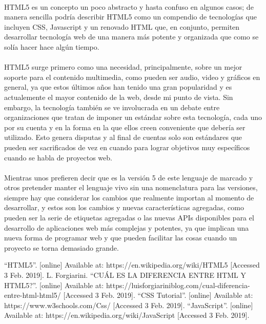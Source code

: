 \documentclass{article}
\begin{document}
\paragraph{}
HTML5 es un concepto un poco abstracto y hasta confuso en algunos casos; de
manera sencilla podría describir HTML5 como un compendio de tecnologías que
incluyen CSS, Javascript y un renovado HTML que, en conjunto, permiten
desarrollar tecnología web de una manera más potente y organizada que como se
solía hacer hace algún tiempo.

\paragraph{}
HTML5 surge primero como una necesidad, principalmente, sobre un mejor soporte
para el contenido multimedia, como pueden ser audio, video y gráficos en general,
ya que estos últimos años han tenido una gran popularidad y es actualemente
el mayor contenido de la web, desde mi punto de vista. Sin embargo, la tecnología
también se ve involucrada en un debate entre organizaciones que tratan de imponer
un estándar sobre esta tecnología, cada uno por su cuenta y en la forma en la
que ellos creen conveniente que debería ser utilizado. Esto genera disputas y
al final de cuentas solo son estándares que pueden ser sacrificados de vez en
cuando para lograr objetivos muy específicos cuando se habla de proyectos
web.

\paragraph{}
Mientras unos prefieren decir que es la versión 5 de este lenguaje de marcado
y otros pretender manter el lenguaje vivo sin una nomenclatura para las versiones,
siempre hay que considerar los cambios que realmente importan al momento de
desarrollar, y estos son los cambios y nuevas características agregadas, como
pueden ser la serie de etiquetas agregadas o las nuevas APIs disponibles para
el desarrollo de aplicaciones web más complejas y potentes, ya que implican una
nueva forma de programar web y que pueden facilitar las cosas cuando un proyecto
se torna demasiado grande.

\begin{thebibliography}{}
	``HTML5''. [online]
	Available at: https://en.wikipedia.org/wiki/HTML5
	[Accessed 3 Feb. 2019].
	L. Forgiarini. ``CUÁL ES LA DIFERENCIA ENTRE HTML Y HTML5?''.
	[online] Available at: https://luisforgiariniblog.com/cual-diferencia-entre-html-html5/
	[Accessed 3 Feb. 2019].
	``CSS Tutorial''.
	[online] Available at: https://www.w3schools.com/Css/
	[Accessed 3 Feb. 2019].
	``JavaScript''.
	[online] Available at: https://en.wikipedia.org/wiki/JavaScript
	[Accessed 3 Feb. 2019].
\end{thebibliography}
\end{document}
